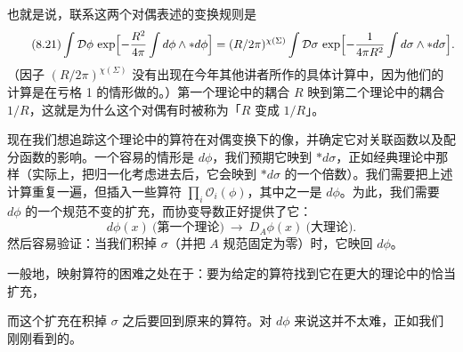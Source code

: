 
也就是说，联系这两个对偶表述的变换规则是
\begin{equation}
  \tag{8.21}
  \label{eq:8-21}
  \int\mathcal{D}\phi\,\exp\Bigl[-\frac{R^2}{4\pi}\int d\phi\wedge\ast d\phi\Bigr]
  =(R/2\pi)^{\chi(\Sigma)}\int\mathcal{D}\sigma\,\exp\Bigl[-\frac{1}{4\pi R^2}\int d\sigma\wedge\ast d\sigma\Bigr].
\end{equation}
（因子 $(R/2\pi)^{\chi(\Sigma)}$ 没有出现在今年其他讲者所作的具体计算中，因为他们的计算是在亏格 1 的情形做的。）第一个理论中的耦合 $R$ 映到第二个理论中的耦合 $1/R$，这就是为什么这个对偶有时被称为「$R$ 变成 $1/R$」。


现在我们想追踪这个理论中的算符在对偶变换下的像，并确定它对关联函数以及配分函数的影响。一个容易的情形是 $d\phi$，我们预期它映到 $\ast d\sigma$，正如经典理论中那样（实际上，把归一化考虑进去后，它会映到 $\ast d\sigma$ 的一个倍数）。我们需要把上述计算重复一遍，但插入一些算符 $\prod_i\mathcal{O}_i(\phi)$，其中之一是 $d\phi$。为此，我们需要 $d\phi$ 的一个规范不变的扩充，而协变导数正好提供了它：
\begin{equation}
  \tag{8.22}
  \label{eq:8-22}
  d\phi(x)\ \bigl(\text{第一个理论}\bigr)\ \longrightarrow\ D_A\phi(x)\ \bigl(\text{大理论}\bigr).
\end{equation}
然后容易验证：当我们积掉 $\sigma$（并把 $A$ 规范固定为零）时，它映回 $d\phi$。

一般地，映射算符的困难之处在于：要为给定的算符找到它在更大的理论中的恰当扩充，

而这个扩充在积掉 $\sigma$ 之后要回到原来的算符。对 $d\phi$ 来说这并不太难，正如我们刚刚看到的。

